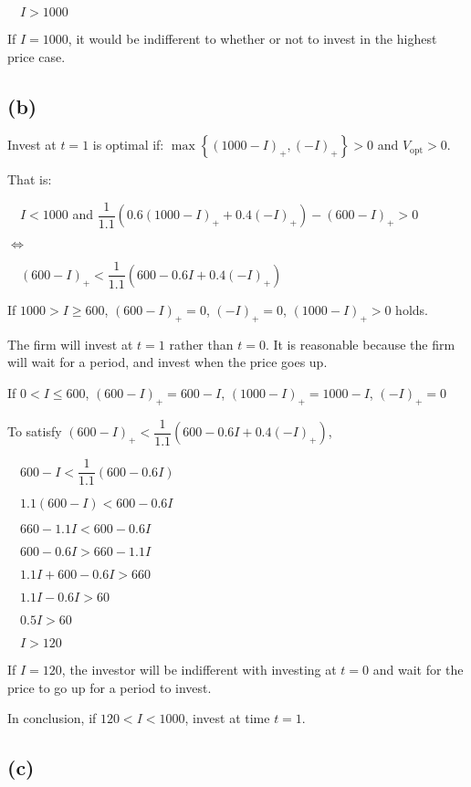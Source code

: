 \documentclass{article}
\begin{document}
$\quad I>1000$

If $I=1000$, it would be indifferent to whether or not to invest in the highest price case. 

\subsection*{(b)}

Invest at $t=1$ is optimal if: $\max\left\{\left(1000-I\right)_{+},\left(-I\right)_{+}\right\}>0$ and $V_{\text{opt}}>0$.

That is:

$\quad I<1000$ and $\dfrac{1}{1.1}\left(0.6\left(1000-I\right)_{+}+0.4\left(-I\right)_{+}\right)-\left(600-I\right)_{+}>0$

$\iff$

$\quad \left(600-I\right)_{+}<\dfrac{1}{1.1}\left(600-0.6I+0.4\left(-I\right)_{+}\right)$

If $1000>I\geqslant600$, $\left(600-I\right)_{+}=0$, $\left(-I\right)_{+}=0$, $\left(1000-I\right)_{+}>0$ holds.

The firm will invest at $t=1$ rather than $t=0$. It is reasonable because the firm will wait for a period, and invest when the price goes up. 

If $0<I\leqslant600$, $\left(600-I\right)_{+}=600-I$, $\left(1000-I\right)_{+}=1000-I$, $\left(-I\right)_{+}=0$

To satisfy $\left(600-I\right)_{+}<\dfrac{1}{1.1}\left(600-0.6I+0.4\left(-I\right)_{+}\right)$,

$\quad 600-I<\dfrac{1}{1.1}\left(600-0.6I\right)$

$\quad 1.1\left(600-I\right)<600-0.6I$

$\quad 660-1.1I<600-0.6I$

$\quad 600-0.6I>660-1.1I$

$\quad 1.1I+600-0.6I>660$

$\quad 1.1I-0.6I>60$

$\quad 0.5I>60$

$\quad I>120$

If $I=120$, the investor will be indifferent with investing at $t=0$ and wait for the price to go up for a period to invest.

In conclusion, if $120<I<1000$, invest at time $t=1$.

\subsection*{(c)}
\end{document}
